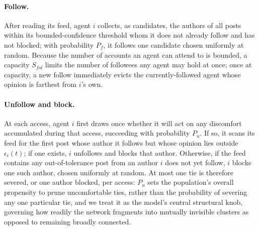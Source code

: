 \documentclass{svproc}
\begin{document}
\paragraph{Follow.} After reading its feed, agent $i$ collects, as candidates, the authors of all posts within its bounded-confidence threshold whom it does not already follow and has not blocked; with probability $P_f$, it follows one candidate chosen uniformly at random. Because the number of accounts an agent can attend to is bounded, a capacity $S_{fol}$ limits the number of followees any agent may hold at once; once at capacity, a new follow immediately evicts the currently-followed agent whose opinion is farthest from $i$'s own.

\paragraph{Unfollow and block.} At each access, agent $i$ first draws once whether it will act on any discomfort accumulated during that access, succeeding with probability $P_u$. If so, it scans its feed for the first post whose author it follows but whose opinion lies outside $\epsilon_i(t)$; if one exists, $i$ unfollows and blocks that author. Otherwise, if the feed contains any out-of-tolerance post from an author $i$ does not yet follow, $i$ blocks one such author, chosen uniformly at random. At most one tie is therefore severed, or one author blocked, per access: $P_u$ sets the population's overall propensity to prune uncomfortable ties, rather than the probability of severing any one particular tie, and we treat it as the model's central structural knob, governing how readily the network fragments into mutually invisible clusters as opposed to remaining broadly connected.
\end{document}
